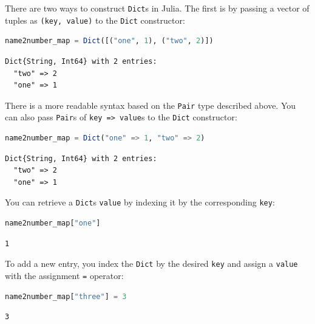\documentclass[
  notoc %
]{tufte-book}
\newcommand{\passthrough}[1]{#1}
\begin{document}
There are two ways to construct \passthrough{\lstinline!Dict!}s in
Julia. The first is by passing a vector of tuples as
\passthrough{\lstinline!(key, value)!} to the
\passthrough{\lstinline!Dict!} constructor:

\begin{lstlisting}[language=Julia]
name2number_map = Dict([("one", 1), ("two", 2)])
\end{lstlisting}

\begin{lstlisting}[language=Output]
Dict{String, Int64} with 2 entries:
  "two" => 2
  "one" => 1
\end{lstlisting}

There is a more readable syntax based on the
\passthrough{\lstinline!Pair!} type described above. You can also pass
\passthrough{\lstinline!Pair!}s of
\passthrough{\lstinline!key => value!}s to the
\passthrough{\lstinline!Dict!} constructor:

\begin{lstlisting}[language=Julia]
name2number_map = Dict("one" => 1, "two" => 2)
\end{lstlisting}

\begin{lstlisting}[language=Output]
Dict{String, Int64} with 2 entries:
  "two" => 2
  "one" => 1
\end{lstlisting}

You can retrieve a \passthrough{\lstinline!Dict!}s
\passthrough{\lstinline!value!} by indexing it by the corresponding
\passthrough{\lstinline!key!}:

\begin{lstlisting}[language=Julia]
name2number_map["one"]
\end{lstlisting}

\begin{lstlisting}[language=Output]
1
\end{lstlisting}

To add a new entry, you index the \passthrough{\lstinline!Dict!} by the
desired \passthrough{\lstinline!key!} and assign a
\passthrough{\lstinline!value!} with the assignment
\passthrough{\lstinline!=!} operator:

\begin{lstlisting}[language=Julia]
name2number_map["three"] = 3
\end{lstlisting}

\begin{lstlisting}[language=Output]
3
\end{lstlisting}
\end{document}
